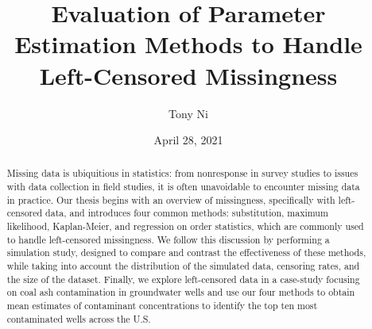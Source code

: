 \documentclass[12pt, twoside]{amherstthesis}
\title{Evaluation of Parameter Estimation Methods to Handle Left-Censored Missingness}
\author{Tony Ni}
\date{April 28, 2021}
\begin{document}
\doublespace
  \maketitle

\frontmatter %
\pagestyle{fancyplain}

  \begin{abstract}
    Missing data is ubiquitious in statistics: from nonresponse in survey studies to issues with data collection in field studies, it is often unavoidable to encounter missing data in practice. Our thesis begins with an overview of missingness, specifically with
    left-censored data, and introduces four common methods: substitution, maximum likelihood, Kaplan-Meier, and regression on order statistics, which are commonly used to handle left-censored missingness. We follow this discussion by performing a simulation study, designed to compare and contrast the effectiveness of these methods, while taking into account the distribution of the simulated data, censoring rates, and the size of the dataset. Finally, we explore left-censored data in a case-study focusing on coal ash contamination in groundwater wells and use our four methods to obtain mean estimates of contaminant concentrations to identify the top ten most contaminated wells across the U.S.
  \end{abstract}
\end{document}
